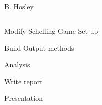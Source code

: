 \documentclass[12pt]{amsart}
\begin{document}
\raggedbottom

\hspace{\fill} {\large B. Hosley}
\bigskip


\setcounter{section}{}
\setcounter{subsection}{}
\subsection{}



Modify Schelling Game Set-up

Build Output methods

Analysis

Write report

Presentation

	
	
\end{document}
